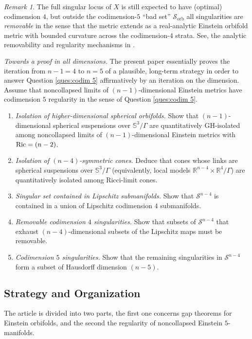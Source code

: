 \documentclass[11pt,reqno]{amsart}
\numberwithin{equation}{section}
\newcommand{\Ric}{{\rm Ric}}
\theoremstyle{definition}
\theoremstyle{remark}
\newtheorem{remark}[thm]{Remark}
\begin{document}
\begin{remark}
The full singular locus of $X$ is still expected to have (optimal) codimension $4$, but outside the codimension-$5$ “bad set” $\mathcal{S}_{\mathrm{orb}}$ all singularities are \emph{removable} in the sense that the metric extends as a real-analytic Einstein orbifold metric with bounded curvature across the codimension-$4$ strata. See, the analytic removability and regularity mechanisms in \cite{su82,bkn,and}.
\end{remark}

\emph{Towards a proof in all dimensions.}
The present paper essentially proves the iteration from $n-1=4$ to $n=5$ of a plausible, long-term strategy in order to answer Question \ref{ques:codim 5} affirmatively by an iteration on the dimension. Assume that noncollapsed limits of $(n-1)$-dimensional Einstein metrics have codimension $5$ regularity in the sense of Question \ref{ques:codim 5}.
\begin{enumerate} 
    \item \emph{Isolation of higher-dimensional spherical orbifolds.} Show that $(n-1)$-dimensional spherical suspensions over $\mathbb{S}^3/\Gamma$ are quantitatively GH-isolated among noncollapsed limits of $(n-1)$-dimensional Einstein metrics with $\Ric = (n-2)$. 
  \item \emph{Isolation of $(n - 4)$-symmetric cones.} Deduce that cones whose links are spherical suspensions over $\mathbb{S}^3/\Gamma$ (equivalently, local models $\mathbb{R}^{n-4}\times \mathbb{R}^4/\Gamma$) are quantitatively isolated among Ricci-limit cones.
  \item \emph{Singular set contained in Lipschitz submanifolds.} Show that $\mathcal{S}^{n-4}$ is contained in a union of Lipschitz codimension $4$ submanifolds. 
  \item \emph{Removable codimension $4$ singularities.} Show that subsets of $\mathcal{S}^{n-4}$ that exhaust $(n-4)$-dimensional subsets of the Lipschitz maps must be removable.
  \item \emph{Codimension $5$ singularities.} Show that the remaining singularities in $\mathcal{S}^{n-4}$ form a subset of Hausdorff dimension $(n-5)$.
\end{enumerate}


\subsection{Strategy and Organization}

The article is divided into two parts, the first one concerns gap theorems for Einstein orbifolds, and the second the regularity of noncollapsed Einstein $5$-manifolds. 
\end{document}

